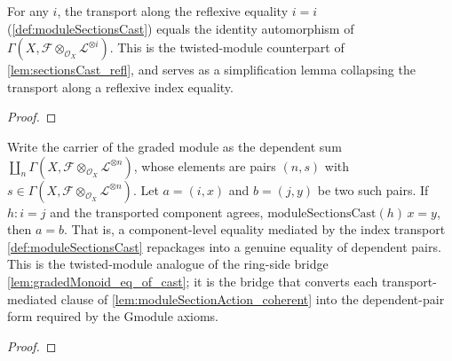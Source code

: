 \begin{lemma}

  \label{lem:moduleSectionsCast_refl}
  For any \(i\), the transport along the reflexive equality \(i = i\)
  (\cref{def:moduleSectionsCast}) equals the identity automorphism of
  \(\Gamma(X, \mathcal{F} \otimes_{\mathcal{O}_X} \mathcal{L}^{\otimes i})\). This is
  the twisted-module counterpart of \cref{lem:sectionsCast_refl}, and serves as a
  simplification lemma collapsing the transport along a reflexive index equality.
\end{lemma}

\begin{proof}\leanok
\end{proof}

\begin{lemma}

  \label{lem:moduleGradedMonoid_eq_of_cast}
  Write the carrier of the graded module as the dependent sum
  \(\coprod_{n} \Gamma(X, \mathcal{F} \otimes_{\mathcal{O}_X} \mathcal{L}^{\otimes n})\),
  whose elements are pairs \((n, s)\) with
  \(s \in \Gamma(X, \mathcal{F} \otimes_{\mathcal{O}_X} \mathcal{L}^{\otimes n})\). Let
  \(a = (i, x)\) and \(b = (j, y)\) be two such pairs. If \(h : i = j\) and the
  transported component agrees, \(\mathrm{moduleSectionsCast}(h)\,x = y\), then
  \(a = b\). That is, a component-level equality mediated by the index transport
  \cref{def:moduleSectionsCast} repackages into a genuine equality of dependent
  pairs. This is the twisted-module analogue of the ring-side bridge
  \cref{lem:gradedMonoid_eq_of_cast}; it is the bridge that converts each
  transport-mediated clause of \cref{lem:moduleSectionAction_coherent} into the
  dependent-pair form required by the \(\mathrm{Gmodule}\) axioms.
\end{lemma}

\begin{proof}

\leanok
\end{proof}

